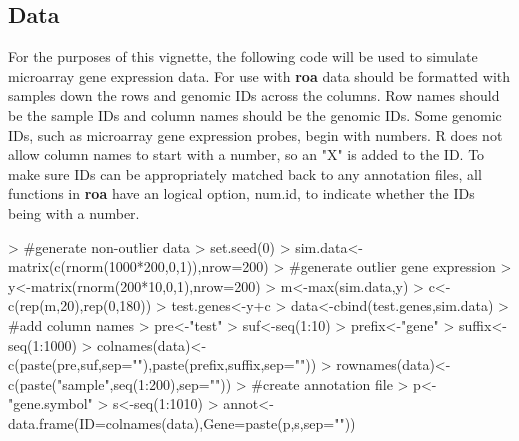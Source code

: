 \documentclass[11pt, a4paper]{article}
\begin{document}
\subsection{Data}
For the purposes of this vignette, the following code will be used to simulate microarray gene expression data. For use with \textbf{roa} data should be formatted with samples down the rows and genomic IDs across the columns. Row names should be the sample IDs and column names should be the genomic IDs. Some genomic IDs, such as microarray gene expression probes, begin with numbers. R does not allow column names to start with a number, so an "X" is added to the ID. To make sure IDs can be appropriately matched back to any annotation files, all functions in \textbf{roa} have an logical option, num.id, to indicate whether the IDs being with a number. 
\begin{Schunk}
\begin{Sinput}
> #generate non-outlier data
>  set.seed(0)
>  sim.data<-matrix(c(rnorm(1000*200,0,1)),nrow=200)
> #generate outlier gene expression
>   y<-matrix(rnorm(200*10,0,1),nrow=200)
>   m<-max(sim.data,y)
>   c<-c(rep(m,20),rep(0,180))
>   test.genes<-y+c
>   data<-cbind(test.genes,sim.data)
> #add column names
>   pre<-"test"
>   suf<-seq(1:10)
>   prefix<-"gene"
>   suffix<-seq(1:1000)
>   colnames(data)<-c(paste(pre,suf,sep=""),paste(prefix,suffix,sep=""))
>   rownames(data)<-c(paste("sample",seq(1:200),sep=""))
> #create annotation file
>   p<-"gene.symbol"
>   s<-seq(1:1010)
>   annot<-data.frame(ID=colnames(data),Gene=paste(p,s,sep=""))
\end{Sinput}
\end{Schunk}
\end{document}
